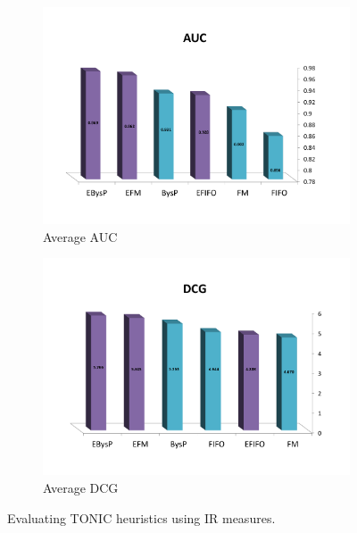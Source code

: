 \documentclass[prodmode,acmtecs]{acmsmall} %
\begin{document}
\begin{figure}
\centering
\begin{subfigure}{.5\textwidth}
  \centering
\includegraphics[width=\linewidth,  trim={2.0cm 2.5cm 2.5cm 5.5cm},clip]{AUC_ALL.pdf}
\caption{Average AUC}
\label{fig:auc}
\end{subfigure}%
\begin{subfigure}{.5\textwidth}
  \centering
\includegraphics[width=\linewidth,  trim={2.0cm 2.5cm 2.5cm 5.5cm},clip]{DCG_AllAlgo.pdf}
\caption{Average DCG}
\label{fig:dcg}
\end{subfigure}
\caption{Evaluating TONIC heuristics using IR measures.}
\label{fig:auc-and-dcg}
\end{figure}
\end{document}
